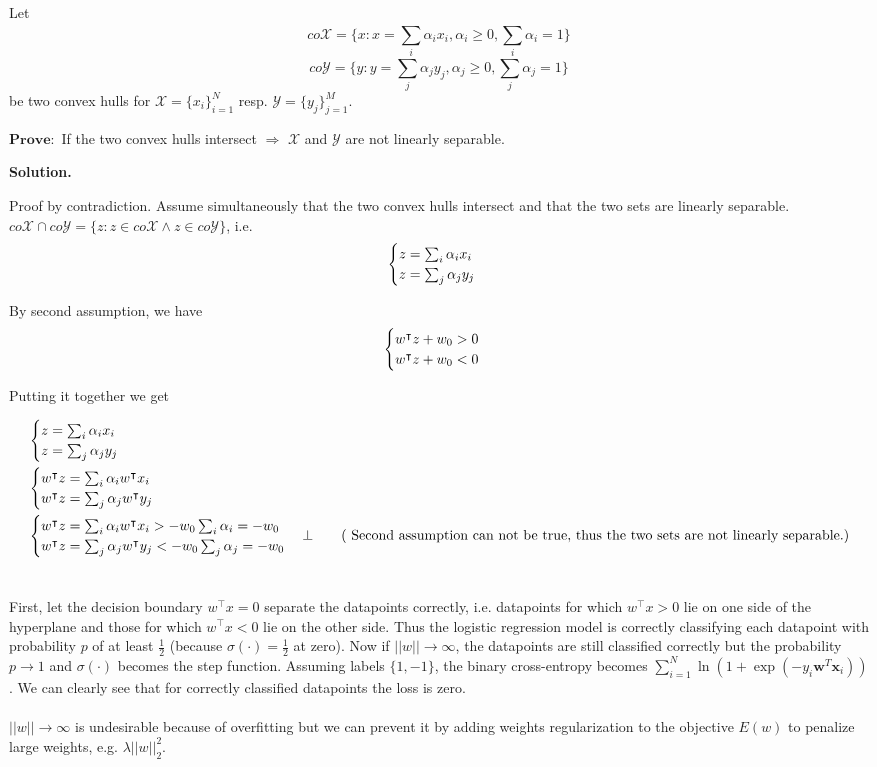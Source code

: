 \documentclass[11pt]{article}
\newcommand{\exercise}{\section{}}
\newcommand{\sumf}[3]{\sum_{#1}^{#2} #3}
\newcommand{\tf}[1]{{#1}^{\intercal}}
\newcommand{\groupf}[2]{%
\begingroup
\begin{cases}
  {#1}  \\
  {#2}
\end{cases}
\endgroup
}
\begin{document}
\exercise

Let $$co\mathcal{X} = \{ x: x = \sumf{i}{}{\alpha_i x_i}, \alpha_i \ge 0, \sumf{i}{}{\alpha_i = 1} \}$$ 
$$co\mathcal{Y} = \{ y: y = \sumf{j}{}{\alpha_j y_j}, \alpha_j \ge 0, \sumf{j}{}{\alpha_j = 1} \}$$
be two convex hulls for $\mathcal{X} = \{ x_i \}^N_{i=1}$ resp. $\mathcal{Y} = \{ y_j \}^M_{j=1}$.

\noindent $\mathbf{Prove:}$ If the two convex hulls intersect $\Rightarrow$ $\mathcal{X}$ and $\mathcal{Y}$ are not linearly separable.

\noindent \textbf{Solution.}

Proof by contradiction. Assume simultaneously that the two convex hulls intersect and that the two sets are linearly separable. \\
$co\mathcal{X} \cap co\mathcal{Y} = \{ z: z \in co\mathcal{X} \wedge z \in co\mathcal{Y} \}$, i.e.
\begin{align*}
\groupf{z = \sumf{i}{}{\alpha_i x_i}}{z = \sumf{j}{}{\alpha_j y_j}}
\end{align*}

By second assumption, we have
\begin{align*}
\groupf{\tf{w} z + w_0 > 0}{\tf{w} z + w_0 < 0}
\end{align*}

Putting it together we get

\begin{align*}
&\groupf{z = \sumf{i}{}{\alpha_i x_i}}{z = \sumf{j}{}{\alpha_j y_j}} \\
&\groupf{\tf{w} z = \sumf{i}{}{\alpha_i \tf{w} x_i}}{\tf{w} z = \sumf{j}{}{\alpha_j \tf{w} y_j}} \\
&\groupf{\tf{w} z = \sumf{i}{}{\alpha_i \tf{w} x_i} >  -w_0 \sumf{i}{}{\alpha_i} = -w_0 }{\tf{w} z = \sumf{j}{}{\alpha_j \tf{w} y_j} < -w_0 \sumf{j}{}{\alpha_j} = -w_0} \bot \tag{ Second assumption can not be true, thus the two sets are not linearly separable.}
\end{align*}

\exercise

First, let the decision boundary $\tf{w}x = 0$ separate the datapoints correctly, i.e. datapoints for which $\tf{w}x > 0$ lie on one side of the hyperplane and those for which $\tf{w}x < 0$ lie on the other side. Thus the logistic regression model is correctly classifying each datapoint with probability $p$ of at least $\frac{1}{2}$ (because $\sigma(\cdot) = \frac{1}{2}$  at zero). Now if $|| w || \rightarrow \infty $, the datapoints are still classified correctly but the probability $p \rightarrow 1$ and  $\sigma(\cdot)$ becomes the step function. Assuming labels $\{ 1, -1 \}$, the binary cross-entropy becomes $\sum_{i=1}^N \ln(1 + \exp(-y_i\mathbf{w}^T\mathbf{x}_i))$. We can clearly see that for correctly classified datapoints the loss is zero. \\ \\
\noindent $|| w || \rightarrow \infty $ is undesirable because of overfitting but we can prevent it by adding weights regularization to the objective $E(w)$ to penalize large weights, e.g. $ \lambda || w ||^2_2 $.
\end{document}
